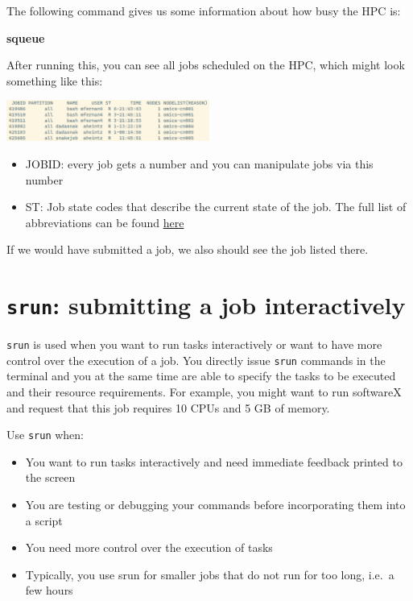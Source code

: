 \documentclass[
  letterpaper,
  DIV=11,
  numbers=noendperiod]{scrreprt}
\newenvironment{Shaded}{}{}
\newcommand{\ExtensionTok}[1]{\textcolor[rgb]{0.84,0.23,0.29}{\textbf{#1}}}
\providecommand{\tightlist}{%
  \setlength{\itemsep}{0pt}\setlength{\parskip}{0pt}}\usepackage{longtable,booktabs,array}
\begin{document}
The following command gives us some information about how busy the HPC
is:

\begin{Shaded}
\begin{Highlighting}[]
\ExtensionTok{squeue}
\end{Highlighting}
\end{Shaded}

After running this, you can see all jobs scheduled on the HPC, which
might look something like this:

\begin{center}
\includegraphics[width=0.5\textwidth,height=\textheight]{../img/squeue.png}
\end{center}

\begin{itemize}
\tightlist
\item
  JOBID: every job gets a number and you can manipulate jobs via this
  number
\item
  ST: Job state codes that describe the current state of the job. The
  full list of abbreviations can be found
  \href{https://curc.readthedocs.io/en/latest/running-jobs/squeue-status-codes.html}{here}
\end{itemize}

If we would have submitted a job, we also should see the job listed
there.

\section{\texorpdfstring{\texttt{srun}: submitting a job
interactively}{srun: submitting a job interactively}}\label{srun-submitting-a-job-interactively}

\texttt{srun} is used when you want to run tasks interactively or want
to have more control over the execution of a job. You directly issue
\texttt{srun} commands in the terminal and you at the same time are able
to specify the tasks to be executed and their resource requirements. For
example, you might want to run softwareX and request that this job
requires 10 CPUs and 5 GB of memory.

Use \texttt{srun} when:

\begin{itemize}
\tightlist
\item
  You want to run tasks interactively and need immediate feedback
  printed to the screen
\item
  You are testing or debugging your commands before incorporating them
  into a script
\item
  You need more control over the execution of tasks
\item
  Typically, you use srun for smaller jobs that do not run for too long,
  i.e.~a few hours
\end{itemize}
\end{document}
